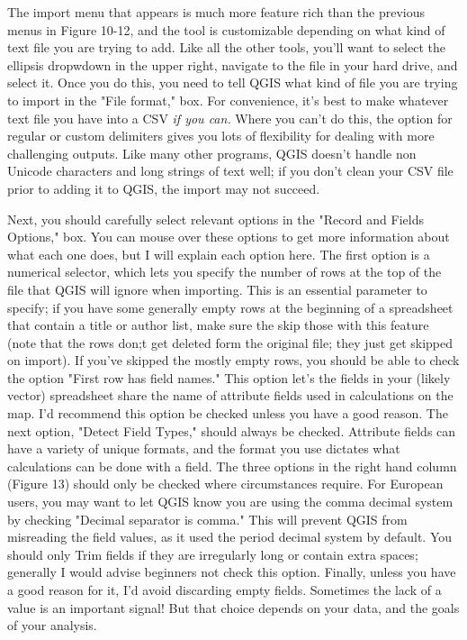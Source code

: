 \documentclass{article}
\begin{document}
The import menu that appears is much more feature rich than the previous menus in Figure 10-12, and the tool is customizable depending on what kind of text file you are trying to add. Like all the other tools, you'll want to select the ellipsis dropwdown in the upper right, navigate to the file in your hard drive, and select it. Once you do this, you need to tell QGIS what kind of file you are trying to import in the "File format," box. For convenience, it's best to make whatever text file you have into a CSV \textit{if you can.} Where you can't do this, the option for regular or custom delimiters gives you lots of flexibility for dealing with more challenging outputs. Like many other programs, QGIS doesn't handle non Unicode characters and long strings of text well; if you don't clean your CSV file prior to adding it to QGIS, the import may not succeed. 

Next, you should carefully select relevant options in the "Record and Fields Options," box. You can mouse over these options to get more information about what each one does, but I will explain each option here. The first option is a numerical selector, which lets you specify the number of rows at the top of the file that QGIS will ignore when importing. This is an essential parameter to specify; if you have some generally empty rows at the beginning of a spreadsheet that contain a title or author list, make sure the skip those with this feature (note that the rows don;t get deleted form the original file; they just get skipped on import). If you've skipped the mostly empty rows, you should be able to check the option "First row has field names." This option let's the fields in your (likely vector) spreadsheet share the name of attribute fields used in calculations on the map.  I'd recommend this option be checked unless you have a good reason. The next option, "Detect Field Types," should always be checked. Attribute fields can have a variety of unique formats, and the format you use dictates what calculations can be done with a field. The three options in the right hand column (Figure 13) should only be checked where circumstances require. For European users, you may want to let QGIS know you are using the comma decimal system by checking "Decimal separator is comma." This will prevent QGIS from misreading the field values, as it used the period decimal system by default. You should only Trim fields if they are irregularly long or contain extra spaces; generally I would advise beginners not check this option. Finally, unless you have a good reason for it, I'd avoid discarding empty fields. Sometimes the lack of a value is an important signal! But that choice depends on your data, and the goals of your analysis. 
\end{document}
